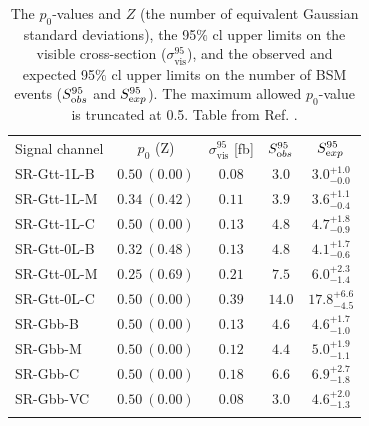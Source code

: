 \begin{table}[htbp]
        \centering
        \small
        \begin{tabular*}{0.6\textwidth}{@{\extracolsep{\fill}}lcccc}
                \noalign{\smallskip}\toprule\noalign{\smallskip}
                Signal channel         & $p_0$ (Z)            & $\sigma^{95}_\mathrm{vis}$ [fb]  &  $S_{\textrm obs}^{95}$  & $S_{\textrm exp}^{95}$   \\
                \noalign{\smallskip}\midrule \noalign{\smallskip}
                SR-Gtt-1L-B & $ 0.50~(0.00) $ &  $0.08$ &  $3.0$ & $ { 3.0 }^{ +1.0 }_{ -0.0 }$ \\[1mm]
                SR-Gtt-1L-M & $ 0.34~(0.42)$ &  $0.11$ &  $3.9$ & $ { 3.6 }^{ +1.1 }_{ -0.4 }$ \\[1mm]
                SR-Gtt-1L-C & $ 0.50~(0.00)$ &  $0.13$ &  $4.8$ & $ { 4.7 }^{ +1.8 }_{ -0.9 }$ \\[1mm]
                \noalign{\smallskip}\midrule \noalign{\smallskip}
                SR-Gtt-0L-B & $ 0.32~(0.48)$ & $0.13$ &  $4.8$ & $ { 4.1 }^{ +1.7 }_{ -0.6 }$  \\[1mm]
                SR-Gtt-0L-M & $ 0.25~(0.69)$ &  $0.21$ &  $7.5$ & $ { 6.0 }^{ +2.3 }_{ -1.4 }$ \\[1mm]
                SR-Gtt-0L-C & $ 0.50~(0.00)$ &  $0.39$ &  $14.0$ & $ { 17.8 }^{ +6.6 }_{ -4.5 }$ \\[1mm] %
                \noalign{\smallskip}\midrule\noalign{\smallskip}
                SR-Gbb-B & $ 0.50~(0.00) $ &  $0.13$ &  $4.6$ & $ { 4.6 }^{ +1.7 }_{ -1.0 }$  \\[1mm]
                SR-Gbb-M & $ 0.50~(0.00) $ & $0.12$ &  $4.4$ & $ { 5.0 }^{ +1.9 }_{ -1.1 }$ \\[1mm]
                SR-Gbb-C & $ 0.50~(0.00) $ &  $0.18$ &  $6.6$ & $ { 6.9 }^{ +2.7 }_{ -1.8 }$ \\[1mm]
                SR-Gbb-VC & $ 0.50~(0.00) $ &  $0.08$ &  $3.0$ & $ { 4.6 }^{ +2.0 }_{ -1.3 }$\\
                \noalign{\smallskip}\midrule\noalign{\smallskip}
        \end{tabular*}
                \caption{The $p_0$-values and $Z$ (the number of equivalent Gaussian standard deviations), 
        	the 95$\%$ \gls{cl} upper limits on the visible cross-section
                ($\sigma^{95}_\mathrm{vis}$),
                and the observed and
                expected 95$\%$ \gls{cl} upper limits on the number of BSM events ($S_{\textrm
                obs}^{95}$ and $S_{\textrm exp}^{95}$). The maximum
              allowed $p_0$-value
              is truncated at 0.5.  Table from Ref. \cite{Aaboud:2017hrg}.}
        \label{mod-ind-lim}
\end{table}

